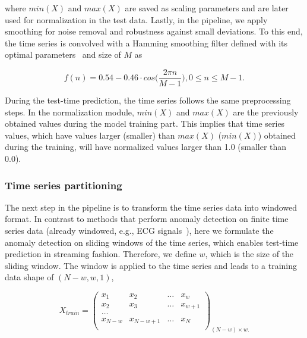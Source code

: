 where $min(X)$ and $max(X)$ are saved as scaling parameters and are later used for normalization in the test data. Lastly, in the pipeline, we apply smoothing for noise removal and robustness against small deviations. To this end, the time series is convolved with a Hamming smoothing filter defined with its optimal parameters~\cite{1163506} and size of $M$ as

\begin{equation}\label{eq9}
f(n)=0.54-0.46 \cdot cos\bigg( \frac{2\pi n}{M-1}\bigg), 0 \leq n \leq M-1.
\end{equation}

During the test-time prediction, the time series follows the same preprocessing steps. In the normalization module, $min(X)$ and $max(X)$ are the previously obtained values during the model training part. 
This implies that time series values, which have values larger (smaller) than $max(X)$ ($min(X)$) obtained during the training, will have normalized values larger than 1.0 (smaller than 0.0). 


\subsubsection*{Time series partitioning}\label{reshapingtimeseries}
The next step in the pipeline is to transform the time series data into windowed format. In contrast to methods that perform anomaly detection on finite time series data (already windowed, e.g., ECG signals~\cite{acker2017patient}), here we formulate the anomaly detection on sliding windows of the time series, which enables test-time prediction in streaming fashion. Therefore, we define $w$, which is the size of the sliding window. The window is applied to the time series and leads to a training data shape of $(N-w, w, 1)$,

\begin{equation}\label{timeseriespartitioning}
X_{train} = 
\begin{pmatrix}
x_1 & x_2 & \dots & x_{w}\\
x_2 & x_3 & \dots & x_{w+1} \\
\dots \\
x_{N-w} & x_{N-w+1} & \dots & x_{N} \\
\end{pmatrix}_{(N-w) \times w.}
\end{equation}

